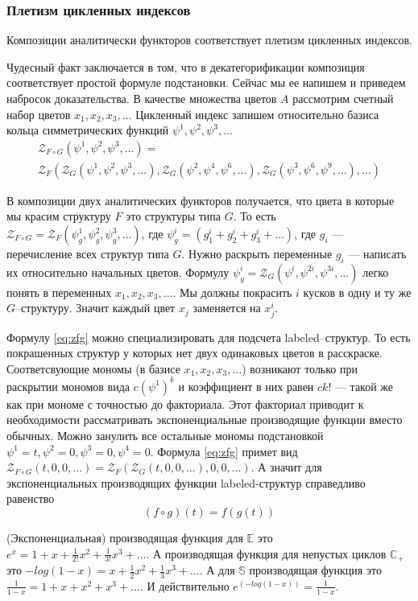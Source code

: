 \subsubsection{Плетизм цикленных индексов}
\begin{theorem}
Композиции аналитически функторов соответствует плетизм цикленных
индексов.
\end{theorem}
Чудесный факт заключается в том, что в декатегорификации
композиция соответствует простой формуле подстановки. Сейчас мы ее напишем и
приведем набросок доказательства. В качестве множества цветов $A$ рассмотрим
счетный набор цветов $x_1, x_2, x_3, \dots$ Цикленный индекс запишем
относительно базиса кольца симметрических функций $\psi^1, \psi^2, \psi^3, \dots$
\begin{multline}
\label{eq:zfg}
	\mathcal Z_{F \circ G} (\psi^1, \psi^2, \psi^3, \dots) = \\
	\mathcal Z_F(
		\mathcal Z_G(\psi^1, \psi^2, \psi^3, \dots),
		\mathcal Z_G(\psi^2, \psi^4, \psi^6, \dots),
		\mathcal Z_G(\psi^3, \psi^6, \psi^9, \dots),
		\dots
	)
\end{multline}

В композиции двух аналитических функторов получается, что цвета в которые мы
красим структуру $F$ это структуры типа $G$. То есть $\mathcal Z_{F \circ G} =
\mathcal Z_F(\psi_g^1, \psi_g^2, \psi_g^3, \dots)$, где $\psi_g^i = (g_1^i +
g_2^i + g_3^i + \dots)$, где $g_i$ --- перечисление всех структур типа $G$.
Нужно раскрыть переменные $g_i $ --- написать их относительно начальных цветов.
Формулу $\psi_g^i = \mathcal Z_G(\psi^i, \psi^{2i}, \psi^{3i}, \dots)$ легко
понять в переменных $x_1, x_2, x_3, \dots$. Мы должны покрасить $i$ кусков в
одну и ту же $G$--структуру. Значит каждый цвет $x_j$ заменяется на $x_j^i$.

Формулу \ref{eq:zfg} можно специализировать для подсчета labeled--структур. То
есть покрашенных структур у которых нет двух одинаковых цветов в расскраске.
Соответсвующие мономы (в базисе $x_1, x_2, x_3, \dots$) возникают только при
раскрытии мономов вида $c(\psi^1)^k$ и коэффициент в них равен $ck!$ --- такой
же как при мономе с точностью до факториала. Этот факториал приводит к
необходимости рассматривать экспоненциальные производящие функции вместо
обычных. Можно занулить все остальные мономы подстановкой $\psi^1 = t, \psi^2 =
0, \psi^3 = 0, \psi^4 = 0$. Формула \ref{eq:zfg} примет вид $
\mathcal Z_{F \circ G} (t, 0, 0, \dots) =
	\mathcal Z_F(
		\mathcal Z_G(t, 0, 0, \dots), 0, 0, \dots
	)
$.
А значит для экспоненциальных производящих функции labeled-структур справедливо
равенство
\begin{equation}
\label{eq:comp}
(f \circ g) (t) = f(g(t))
\end{equation}

\begin{example}
(Экспоненциальная) производящая функция для $\mathbb E$ это $e^x = 1 + x +
\frac{1}{2!}x^2 + \frac{1}{3!}x^3 + \dots$. А производящая функция для
непустых циклов $\mathbb C_{+}$ это $-log(1-x) = x + \frac{1}{2}x^2 +
\frac{1}{3}x^3 + \dots$.
А для $\mathbb S$ производящая функция это $\frac{1}{1-x} = 1 + x + x^2 + x^3 +
\dots$.
И действительно $e^(-log(1-x)) = \frac{1}{1-x}$.
\end{example}

